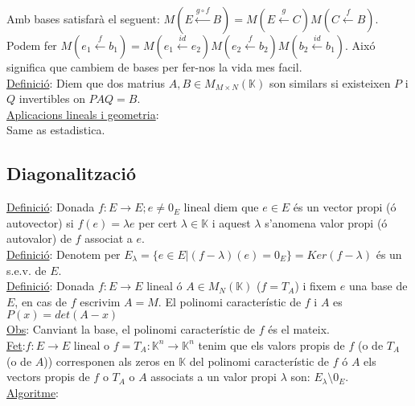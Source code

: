 \documentclass[../main.tex]{subfiles}
\begin{document}
    Amb bases satisfarà el seguent: $M(E \xleftarrow{g \circ f} B) = M(E \xleftarrow{g} C)M(C \xleftarrow{f} B)$.\\
    Podem fer $M(e_1 \xleftarrow{f} b_1) = M(e_1 \xleftarrow{id} e_2)M(e_2 \xleftarrow{f} b_2)M(b_2 \xleftarrow{id} b_1)$. Aixó significa que cambiem de bases per fer-nos la vida mes facil.\\
    \underline{Definició}: Diem que dos matrius $A, B \in M_{M\times N}(\mathbb{K})$ son similars si existeixen $P$ i $Q$ invertibles on $PAQ = B$.\\
    \underline{Aplicacions lineals i geometria}:\\
    Same as estadistica.
    \subsection{Diagonalització}
    \underline{Definició}: Donada $f: E \rightarrow E; e \neq 0_E$ lineal diem que $e \in E$ és un vector propi (ó autovector) si $f(e) = \lambda e$ per cert $\lambda \in \mathbb{K}$ i aquest $\lambda$ s'anomena valor propi (ó autovalor) de $f$ associat a $e$. \\
    \underline{Definició}: Denotem per $E_\lambda = \{e\in E | (f-\lambda)(e) = 0_E\} = Ker(f-\lambda)$ és un s.e.v. de $E$.\\
    \underline{Definició}: Donada $f: E \rightarrow E$ lineal ó $A \in M_N(\mathbb{K})$ ($f=T_A$) i fixem $e$ una base de $E$, en cas de $f$ escrivim $A=M$. El polinomi característic de $f$ i $A$ es $P(x) = det(A-x)$\\
    \underline{Obs}: Canviant la base, el polinomi característic de $f$ és el mateix.\\
    \underline{Fet}:$f: E \rightarrow E$ lineal o $f = T_A: \mathbb{K}^n \rightarrow \mathbb{K}^n$ tenim que els valors propis de $f$ (o de $T_A$ (o de $A$)) corresponen als zeros en $\mathbb{K}$ del polinomi característic de $f$ ó $A$ els vectors propis de $f$ o $T_A$ o $A$ associats a un valor propi $\lambda$ son: $E_\lambda \setminus 0_E$.\\
    \underline{Algoritme}: 
\end{document}
